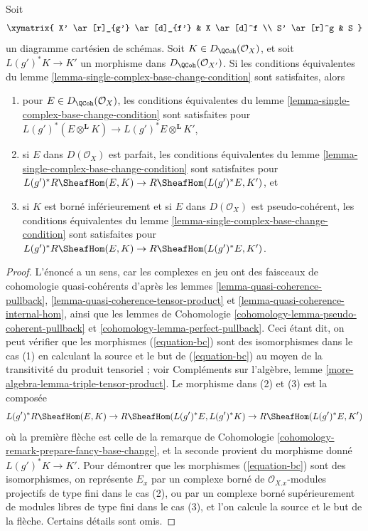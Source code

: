 \begin{lemma}
\label{lemma-single-complex-base-change-condition-inherited}
Soit
$$
\xymatrix{
X' \ar[r]_{g'} \ar[d]_{f'} &
X \ar[d]^f \\
S' \ar[r]^g &
S
}
$$
un diagramme cartésien de schémas. Soit $K \in D_\QCoh(\mathcal{O}_X)$,
et soit $L(g')^*K \to K'$ un morphisme dans $D_\QCoh(\mathcal{O}_{X'})$.
Si les conditions équivalentes du
lemme \ref{lemma-single-complex-base-change-condition} sont satisfaites, alors
\begin{enumerate}
\item pour $E \in D_\QCoh(\mathcal{O}_X)$, les conditions
équivalentes du lemme \ref{lemma-single-complex-base-change-condition} sont satisfaites
pour $L(g')^*(E \otimes^\mathbf{L} K) \to L(g')^*E \otimes^\mathbf{L} K'$,
\item si $E$ dans $D(\mathcal{O}_X)$ est parfait, les conditions équivalentes du
lemme \ref{lemma-single-complex-base-change-condition} sont satisfaites pour
$L(g')^*R\SheafHom(E, K) \to R\SheafHom(L(g')^*E, K')$, et
\item si $K$ est borné inférieurement et si $E$ dans $D(\mathcal{O}_X)$ est
pseudo-cohérent, les conditions équivalentes du
lemme \ref{lemma-single-complex-base-change-condition} sont satisfaites pour
$L(g')^*R\SheafHom(E, K) \to R\SheafHom(L(g')^*E, K')$.
\end{enumerate}
\end{lemma}

\begin{proof}
L'énoncé a un sens, car les complexes en jeu ont des faisceaux de cohomologie
quasi-cohérents d'après les lemmes
\ref{lemma-quasi-coherence-pullback},
\ref{lemma-quasi-coherence-tensor-product} et
\ref{lemma-quasi-coherence-internal-hom}, ainsi que les
lemmes de Cohomologie \ref{cohomology-lemma-pseudo-coherent-pullback} et
\ref{cohomology-lemma-perfect-pullback}.
Ceci étant dit, on peut vérifier que les morphismes (\ref{equation-bc})
sont des isomorphismes dans le cas (1) en calculant la source et le but
de (\ref{equation-bc}) au moyen de la transitivité du produit tensoriel ; voir
Compléments sur l'algèbre, lemme \ref{more-algebra-lemma-triple-tensor-product}.
Le morphisme dans (2) et (3) est la composée
$$
L(g')^*R\SheafHom(E, K) \to R\SheafHom(L(g')^*E, L(g')^*K)
\to R\SheafHom(L(g')^*E, K')
$$
où la première flèche est celle de la
remarque de Cohomologie \ref{cohomology-remark-prepare-fancy-base-change},
et la seconde provient du morphisme donné $L(g')^*K \to K'$.
Pour démontrer que les morphismes (\ref{equation-bc}) sont des isomorphismes, on représente
$E_x$ par un complexe borné de $\mathcal{O}_{X. x}$-modules projectifs de type fini
dans le cas (2), ou par un complexe borné supérieurement de modules libres de type fini dans le cas (3),
et l'on calcule la source et le but de la flèche.
Certains détails sont omis.
\end{proof}

